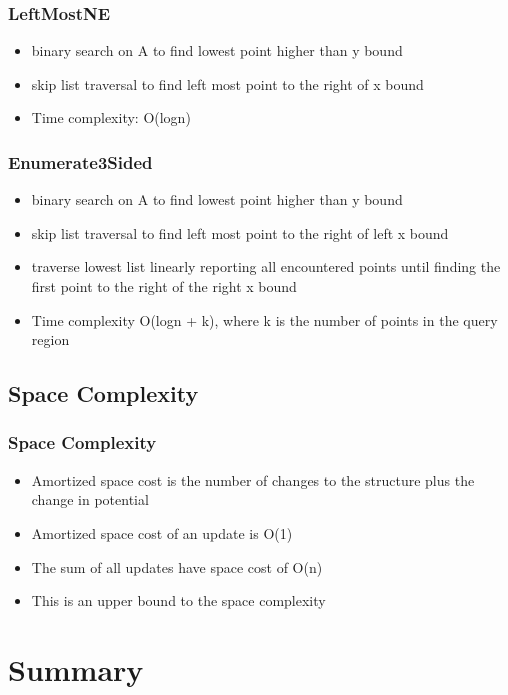\documentclass{beamer}
\begin{document}
\begin{frame}
  \frametitle{LeftMostNE}

  \begin{itemize}
  \item
    binary search on A to find lowest point higher than y bound
  \item
    skip list traversal to find left most point to the right of x bound
  \item
    Time complexity: O(logn)
  \end{itemize}

\end{frame}

\begin{frame}
  \frametitle{Enumerate3Sided}

  \begin{itemize}
  \item
    binary search on A to find lowest point higher than y bound
  \item
    skip list traversal to find left most point to the right of left x bound
  \item
    traverse lowest list linearly reporting all encountered points
    until finding the first point to the right of the right x bound
  \item
    Time complexity O(logn + k), where k is the number of points in the 
    query region
  \end{itemize}
\end{frame}

\subsection{Space Complexity}

\begin{frame}
  \frametitle{Space Complexity}

  \begin{itemize}
  \item
    Amortized space cost is the number of changes to the structure plus the
    change in potential
  \item
    Amortized space cost of an update is O(1)
  \item
    The sum of all updates have space cost of O(n)
  \item
    This is an upper bound to the space complexity
  \end{itemize}  
\end{frame}

\section*{Summary}
\end{document}
